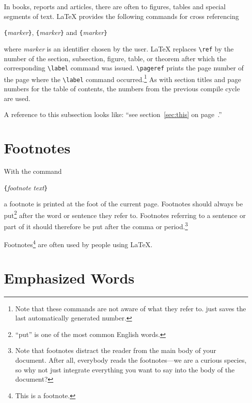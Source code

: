 In books, reports and articles, there are often
 to figures, tables and special segments of text.
\LaTeX{} provides the following commands for cross referencing
\begin{lscommand}
\verb|{|\emph{marker}\verb|}|, \verb|{|\emph{marker}\verb|}|
and \verb|{|\emph{marker}\verb|}|
\end{lscommand}
\noindent where \emph{marker} is an identifier chosen by the user. \LaTeX{}
replaces \verb|\ref| by the number of the section, subsection, figure,
table, or theorem after which the corresponding \verb|\label| command
was issued. \verb|\pageref| prints the page number of the
page where the \verb|\label| command occurred.\footnote{Note that these commands
  are not aware of what they refer to.  just saves the last
  automatically generated number.} As with section titles and page numbers for the table of contents,
the numbers from the previous compile cycle are used.


\begin{example}
A reference to this subsection
\label{sec:this} looks like:
``see section~\ref{sec:this} on
page~\pageref{sec:this}.''
\end{example}

\section{Footnotes}
With the command
\begin{lscommand}
\verb|{|\emph{footnote text}\verb|}|
\end{lscommand}
\noindent a footnote is printed at the foot of the current page.  Footnotes
should always be put\footnote{``put'' is one of the most common
  English words.} after the word or sentence they refer to. Footnotes
referring to a sentence or part of it should therefore be put after
the comma or period.\footnote{Note that footnotes
  distract the reader from the main body of your document. After all,
  everybody reads the footnotes---we are a curious species, so why not
  just integrate everything you want to say into the body of the
  document?\footnotemark}

\begin{example}
Footnotes\footnote{This is
  a footnote.} are often used
by people using \LaTeX.
\end{example}

\section{Emphasized Words}

